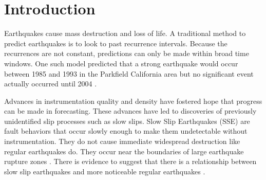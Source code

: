 \documentclass[]{llncs} %
\begin{document}
\begin{abstract}
\end{abstract}

\section{Introduction}
Earthquakes cause mass destruction and loss of life. A traditional method to predict earthquakes is to look to past recurrence intervals. Because the recurrences are not constant, predictions can only be made within broad time windows. One such model predicted that a strong earthquake would occur between 1985 and 1993 in the Parkfield California area but no significant event actually occurred until 2004 \cite{Jackson}. \par

Advances in instrumentation quality and density have fostered hope that progress can be made in forecasting. These advances have led to discoveries of previously unidentified slip processes such as slow slips. Slow Slip Earthquakes (SSE) are fault behaviors that occur slowly enough to make them undetectable without instrumentation. They do not cause immediate widespread destruction like regular earthquakes do. They occur near the boundaries of large earthquake rupture zones \cite{Slip}. There is evidence to suggest that there is a relationship between slow slip earthquakes and more noticeable regular earthquakes \cite{SlowSlip}. \par
\end{document}
